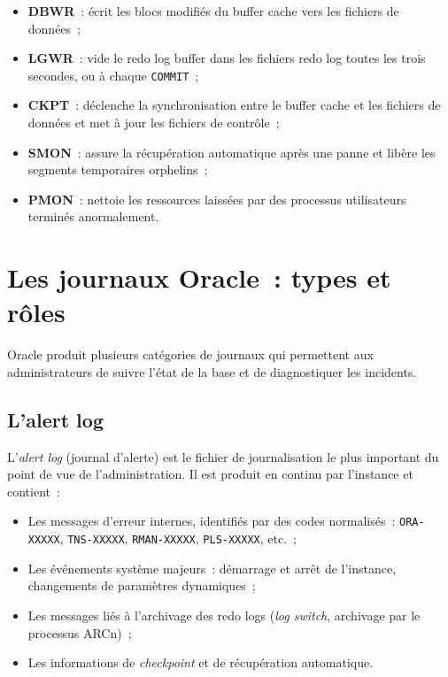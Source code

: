 \documentclass[12pt,a4paper]{report}
\begin{document}
\begin{itemize}[leftmargin=*]
  \item \textbf{DBWR}~: \'ecrit les blocs modifi\'es du buffer cache vers les fichiers
        de donn\'ees~;
  \item \textbf{LGWR}~: vide le redo log buffer dans les fichiers redo log toutes les
        trois secondes, ou \`a chaque \texttt{COMMIT}~;
  \item \textbf{CKPT}~: d\'eclenche la synchronisation entre le buffer cache et les
        fichiers de donn\'ees et met \`a jour les fichiers de contr\^ole~;
  \item \textbf{SMON}~: assure la r\'ecup\'eration automatique apr\`es une panne et
        lib\`ere les segments temporaires orphelins~;
  \item \textbf{PMON}~: nettoie les ressources laiss\'ees par des processus utilisateurs
        termin\'es anormalement.
\end{itemize}

\section{Les journaux Oracle~: types et r\^oles}

Oracle produit plusieurs cat\'egories de journaux qui permettent aux administrateurs
de suivre l'\'etat de la base et de diagnostiquer les incidents.

\subsection{L'alert log}

L'\emph{alert log} (journal d'alerte) est le fichier de journalisation le plus important
du point de vue de l'administration. Il est produit en continu par l'instance et contient~:

\begin{itemize}[leftmargin=*]
  \item Les messages d'erreur internes, identifi\'es par des codes normalis\'es~:
        \texttt{ORA-XXXXX}, \texttt{TNS-XXXXX}, \texttt{RMAN-XXXXX},
        \texttt{PLS-XXXXX}, etc.~;
  \item Les \'ev\'enements syst\`eme majeurs~: d\'emarrage et arr\^et de l'instance,
        changements de param\`etres dynamiques~;
  \item Les messages li\'es \`a l'archivage des redo logs (\emph{log switch}, archivage
        par le processus ARCn)~;
  \item Les informations de \emph{checkpoint} et de r\'ecup\'eration automatique.
\end{itemize}
\end{document}
